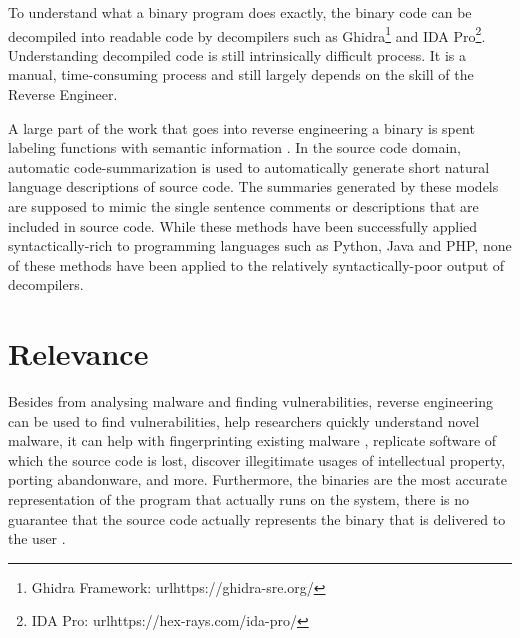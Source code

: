 To understand what a binary program does exactly, the binary code can be decompiled into readable code by decompilers such as Ghidra\footnote{Ghidra Framework: url{https://ghidra-sre.org/}} and IDA Pro\footnote{IDA Pro: url{https://hex-rays.com/ida-pro/}}. Understanding decompiled code is still intrinsically difficult process. It is a manual, time-consuming process and still largely depends on the skill of the Reverse Engineer\cite{TypeInferenceSurvey}.

A large part of the work that goes into reverse engineering a binary is spent labeling functions with semantic information \cite{reverseEngineerProcess}. In the source code domain, automatic code-summarization  \cite{recommend_summarization} is used to automatically generate short natural language descriptions of source code. The summaries generated by these models are supposed to mimic the single sentence comments or descriptions that are included in source code. While these methods have been successfully applied syntactically-rich to programming languages such as Python, Java and PHP\cite{CodeT5, CodeBERT, CodeX}, none of these methods have been applied to the relatively syntactically-poor output of decompilers.

\section{Relevance}
Besides from analysing malware and finding vulnerabilities, reverse engineering can be used to find vulnerabilities, help researchers quickly understand novel malware, it can help with fingerprinting existing malware \cite{TypeInferenceSurvey}, replicate software of which the source code is lost, discover illegitimate usages of intellectual property, porting abandonware, and more\cite{TypeInferenceSurvey}. Furthermore, the binaries are the most accurate representation of the program that actually runs on the system, there is no guarantee that the source code actually represents the binary that is delivered to the user \cite{TypeInferenceSurvey}. 
